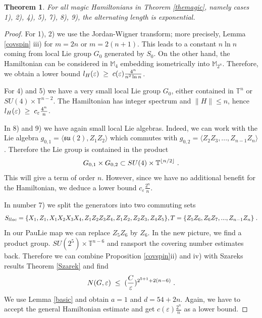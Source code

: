 \documentclass[12pt, a4-paper]{amsart}
\numberwithin{equation}{section}
\newcommand{\kl}{\pl \le \pl}
\newcommand{\gl}{\pl \ge \pl}
\newcommand{\pl}{\hspace{.1cm}}
\newcommand{\eps}{\varepsilon}
\newcommand{\mz}{{\mathbb M}}
\newtheorem{theorem}[lemma]{Theorem}
\begin{document}
\begin{theorem}\label{thm:exponential_m} For all magic Hamiltonians in Theorem \ref{themagic}, namely cases 1), 2), 4), 5), 7), 8), 9), the alternating length is exponential. 
\end{theorem}

\begin{proof} For 1), 2) we use the Jordan-Wigner transform; more precisely, Lemma \ref{covspin} iii) for $m=2n$ or $m=2(n+1)$. This leads to a constant $n\ln n$ coming from local  Lie group $G_0$ generated by $S_0$. On the other hand, the Hamiltonian can be considered in $\mz_4$ embedding isometrically into $\mz_{2^n}$. Therefore, we obtain a lower bound $l_H(\eps)\gl c(\eps) \frac{4^n}{n^2\ln n}$. 

For 4) and 5) we have a very small local Lie group $G_0$, either contained in $\mathbb{T}^n$ or $SU(4)\times \mathbb{T}^{n-2}$. The Hamiltonian has integer spectrum and $\|H\|\le n$, hence $l_H(\eps)\gl c_{\eps}\frac{4^n}{n}$. 

In 8) and 9) we have again small local Lie algebras. Indeed, we can work with the Lie algebra $g_{0,1}=\langle \mathfrak{su}(2),Z_1Z_2\rangle$ which commutes with $g_{0,2}=\langle Z_{2}Z_3,...,Z_{n-1}Z_n\rangle$. Therefore the Lie group is contained in the product 
 \[ G_{0,1}\times G_{0,2} \subset SU(4)\times \mathbb{T}^{\lfloor n/2 \rfloor} \pl. \]
This will give a term of order $n$. However, since we have no additional benefit for the Hamiltonian, we deduce a lower bound $c_{\eps}\frac{2^n}{n}$. 

In number 7) we split the generators into two commuting sets
\[  S_{lloc}=\{X_1,Z_1,X_1X_2X_3X_4, Z_1Z_2Z_3Z_4,Z_1Z_2,Z_2Z_3,Z_4Z_5\}  , 
T=\{Z_5Z_6,Z_6Z_7,...,Z_{n-1}Z_n\}\pl .\] 
In our PauLie map we can replace $Z_5Z_6$ by $Z_6$. In the new picture, we find a product group.  $SU(2^5)\times \mathbb{T}^{n-6}$ and ransport the covering number estimates back. Therefore we can combine Proposition \ref{covspin}ii) and iv) with Szareks results Theorem  \ref{Szarek} and find 
 \[ N(G,\eps)\kl (\frac{C}{\eps})^{2^{5+1}+2(n-6)} \pl. \]
We use Lemma \ref{basic} and obtain $a=1$ and $d=54+2n$. Again, we have to accept the general Hamiltonian estimate and get $c(\eps)\frac{2^n}{n}$ as a lower bound. 
\end{proof}
\end{document}
